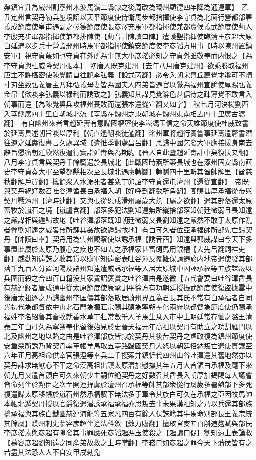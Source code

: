 渠鎮宜升為威州割寧州木波馬嶺二縣隸之後周改為環州顯德四年降為通遠軍】　乙丑定州言契丹勒兵壓境詔以天平節度使侍衛馬步都指揮使李守貞為北面行營都部署義成節度使皇甫遇副之彰德節度使張彦澤充馬軍都指揮使兼都虞候義武節度使薊人李殷充步軍都指揮使兼都排陳使【薊音計陳讀曰陣】遣護聖指揮使臨清王彦超大原白延遇以步兵十營詣邢州時馬軍都指揮使鎮安節度使李彦韜方用事【時以陳州置鎮安軍】視守貞蔑如也守貞在外所為事無大小彦韜必知之守貞外雖敬奉而内恨之【為李守貞與杜威降契丹張本】　初唐人既克建州【去年八月唐克建州】欲乘勝取福州唐主不許樞密使陳覺請自往說李弘義【說式芮翻】必令入朝宋齊丘薦覺才辯可不煩寸刃坐致弘義唐主乃拜弘義母妻皆為國夫人四弟皆遷官以覺為福州宣諭使厚賜弘義金帛【欲啖李弘義以禄利而誘致之】弘義知其謀見覺辭色甚倨待之疎薄覺不敢言入朝事而還【為陳覺興兵攻福州喪敗而還張本還從宣翻又如字】　秋七月河決楊劉西入莘縣廣四十里自朝城北流【莘縣在魏州之東朝城在魏州東南相去四十里廣古曠翻】　有自幽州來者言趙延夀有意歸國樞密使李崧馮玉信之命天雄節度使杜威致書於延夀具述朝旨啖以厚利【朝直遙翻啖徒濫翻】洺州軍將趙行實嘗事延夀遣齎書潜往遺之延夀復書言久處異域【遺惟季翻處昌呂翻】思歸中國乞發大軍應接拔身南去辭旨懇密朝廷欣然復遣行實詣延夀與為期約【晉人自此墮趙延夀計中矣復扶又翻】八月李守貞言與契丹千餘騎遇於長城北【此戰國時燕所築長城也在涿州固安縣南薛史李守貞奏大軍至望都縣相次至長城北遇虜轉鬬】轉鬭四十里斬其酋帥解里【酋慈秋翻解戶買翻】擁餘衆入水溺死者甚衆丁卯詔李守貞還屯澶州【還從宣翻】　帝既與契丹絕好數召吐谷渾酋長白承福入朝【好呼到翻數所角翻】宴賜甚厚承福從帝與契丹戰澶州【澶時連翻】又與張從恩戍滑州屬歲大熱【屬之欲翻】遣其部落還太原畜牧於嵐石之境【嵐盧含翻】部落多犯法劉知遠無所縱捨部落知朝廷微弱且畏知遠之嚴謀相與遁歸故地【吐谷渾部落既知朝廷微弱又畏劉知遠之嚴然不敢于太原作亂者憚劉知遠之威畧無所肆其姦故欲遁歸故地】有白可久者位亞承福帥所部先亡歸契丹【帥讀曰率】契丹用為雲州觀察使以誘承福【誘音酉】知遠與郭威謀曰今天下多事置此屬於太原乃腹心之疾也不如去之承福家甚富飼馬用銀槽【去先呂翻飼祥吏翻】威勸知遠誅之收其貨以贍軍知遠密表吐谷渾反覆難保請遷於内地帝遣使發其部落千九百人分置河陽及諸州知遠遣威誘承福等入居太原城中因誣承福等五族謀叛以兵圍而殺之合四百口籍没其家貲詔褒賞之吐谷渾由是遂微【五代會要曰吐谷渾酋長有赫連鐸者唐咸通中從太原節度使康承訓平徐方有功朝廷授振武節度使復盜據雲中後唐太祖逐之乃歸幽州李匡儔其部落散居蔚州界互為君長其氏不常有白承福者自同光初代為都督依中山北石門為柵莊宗賜其額為寧朔奉化兩府以都督為節度使仍賜承福姓李名紹魯其畜牧就善水草丁壯常數千人羊馬生息入市中土朝廷常存恤之潞王清泰三年白可久為寧朔奉化留後始見於史晉天福元年高祖以契丹有助立之功割雁門以北及幽州之地以賂之由是吐谷渾部族皆隸於契丹其後苦契丹之虐政復為鎮州節度使安重榮所誘乃背契丹率車帳羊馬取五臺路歸國契丹大怒以朝廷招納叛亡遣使責讓至六年正月高祖命供奉官張澄等率兵二千搜索并鎮忻代四州山谷吐渾還其舊地然亦以契丹誅求無厭心不平之命漢高祖出鎮太原潜加慰撫其年五月大首領白承福及麾下來朝九月又遣首領白可久來朝少主嗣位絶契丹之好數召其酋長入朝厚加錫賜每大讌會皆命列坐於勲臣之次至開運捍虜於澶州召承福等帥其部衆從行屬歲多暑熱部下多死復遣歸太原移帳於嵐石州然承福馭下無法多于軍令其族白可久在承福之亞因牧馬帥本帳北遁契丹授以官爵復遣潜誘承福承福亦思叛去事未果漢祖知之乃以兵還其部族擒承福與其族白鐵匱赫連海龍等五家凡四百有餘人伏誅籍其牛馬命别部長王義宗統其餘屬】濮州刺史慕容彦超坐違法科斂【斂力贍翻】擅取官麥五百斛造麴賦與部民李彦韜素與彦超有隙發其事罪應死彦韜趣馮玉使殺之【趣讀曰促】劉知遠上表論救【慕容彦超劉知遠之同產弟故救之上時掌翻】李崧曰如彦超之罪今天下藩侯皆有之若盡其法恐人人不自安甲戌勑免
